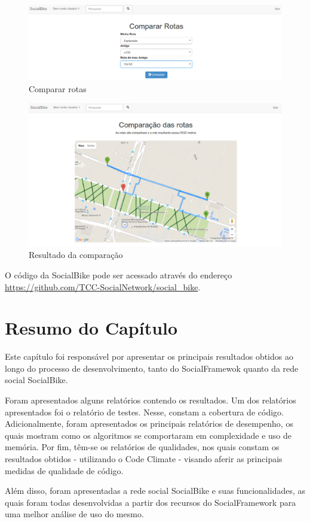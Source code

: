 \begin{figure}[!h]
	\centering
	\includegraphics[scale=0.45]{figuras/resultados/comparar_rotas.eps}
	\caption[Comparar rotas]{Comparar rotas}
	\label{comparar_rotas}
\end{figure}

\begin{figure}[!h]
	\centering
	\includegraphics[scale=0.45]{figuras/resultados/resultado_comparacao.eps}
	\caption[Resultado da comparação]{Resultado da comparação}
	\label{resultado_comparacao}
\end{figure}

O código da SocialBike pode ser acessado através do endereço \url{https://github.com/TCC-SocialNetwork/social_bike}.

\section{Resumo do Capítulo}
Este capítulo foi responsável por apresentar os principais resultados obtidos ao longo do processo de desenvolvimento, tanto do SocialFramewok quanto da rede social SocialBike.

Foram apresentados alguns relatórios contendo os resultados. Um dos relatórios apresentados foi o relatório de testes. Nesse, constam a cobertura de código. Adicionalmente, foram apresentados os principais relatórios de desempenho, os quais mostram como os algoritmos se comportaram em complexidade e uso de memória. Por fim, têm-se os relatórios de qualidades, nos quais constam os resultados obtidos - utilizando o Code Climate - visando aferir as principais medidas de qualidade de código.

Além disso, foram apresentadas a rede social SocialBike e suas funcionalidades, as quais foram todas desenvolvidas a partir dos recursos do SocialFramework para uma melhor análise de uso do mesmo.
